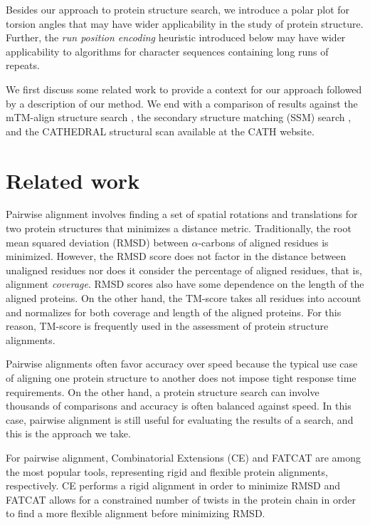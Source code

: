 \documentclass[10pt,letterpaper]{article}
\newcommand{\cas}{$\alpha$-carbons\xspace}
\begin{document}
Besides our approach to protein structure search, we introduce a polar plot for torsion angles that may have wider applicability in the study of protein structure. 
Further, the \emph{run position encoding} heuristic introduced below may have wider applicability to algorithms for character sequences containing long runs of repeats. 

We first discuss some related work to provide a context for our approach followed by a description of our method. 
We end with a comparison of results against the mTM-align structure search \cite{Dong2018}, the secondary structure matching (SSM) search \cite{Krissinel2004}, and the CATHEDRAL structural scan \cite{Redfern2007} available at the CATH website.

\section*{Related work}

Pairwise alignment involves finding a set of spatial rotations and translations for two protein structures that minimizes a distance metric. 
Traditionally, the root mean squared deviation (RMSD) between \cas of aligned residues is minimized.
However, the RMSD score does not factor in the distance between unaligned residues nor does it consider the percentage of aligned residues, that is, alignment \emph{coverage}. 
RMSD scores also have some dependence on the length of the aligned proteins. 
On the other hand, the TM-score \cite{Zhang2004} takes all residues into account and normalizes for both coverage and length of the aligned proteins. 
For this reason, TM-score is frequently used in the assessment of protein structure alignments. 

Pairwise alignments often favor accuracy over speed because the typical use case of aligning one protein structure to another does not impose tight response time requirements. 
On the other hand, a protein structure search can involve thousands of comparisons and accuracy is often balanced against speed. 
In this case, pairwise alignment is still useful for evaluating the results of a search, and this is the approach we take. 

For pairwise alignment, Combinatorial Extensions (CE) \cite{Shindyalov1998} and FATCAT \cite{Ye2003} are among the most popular tools, representing rigid and flexible protein alignments, respectively. 
CE performs a rigid alignment in order to minimize RMSD and FATCAT allows for a constrained number of twists in the protein chain in order to find a more flexible alignment before minimizing RMSD.
\end{document}
